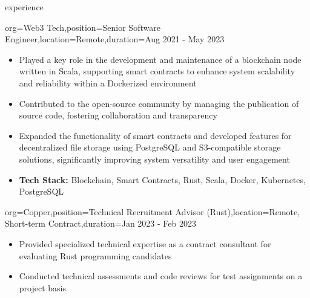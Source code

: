 \documentclass{resume}
\begin{document}
\begin{ResumeSection}{experience}
    \begin{ResumeSubsection}{org=Web3 Tech,position=Senior Software Engineer,location=Remote,duration=Aug 2021 - May 2023}
        \begin{itemize}
            \item Played a key role in the development and maintenance of a blockchain node written in Scala, supporting smart contracts to enhance system scalability and reliability within a Dockerized environment
            \item Contributed to the open-source community by managing the publication of source code, fostering collaboration and transparency
            \item Expanded the functionality of smart contracts and developed features for decentralized file storage using PostgreSQL and S3\mbox{-}compatible storage solutions, significantly improving system versatility and user engagement
            \item \textbf{Tech Stack:} Blockchain, Smart Contracts, Rust, Scala, Docker, Kubernetes, PostgreSQL
        \end{itemize}
    \end{ResumeSubsection}

    \begin{ResumeSubsection}{org=Copper,position=Technical Recruitment Advisor (Rust),location=Remote{, Short-term Contract},duration=Jan 2023 - Feb 2023}
        \begin{itemize}
            \item Provided specialized technical expertise as a contract consultant for evaluating Rust programming candidates
            \item Conducted technical assessments and code reviews for test assignments on a project basis
        \end{itemize}
    \end{ResumeSubsection}


\end{ResumeSection}
\end{document}
